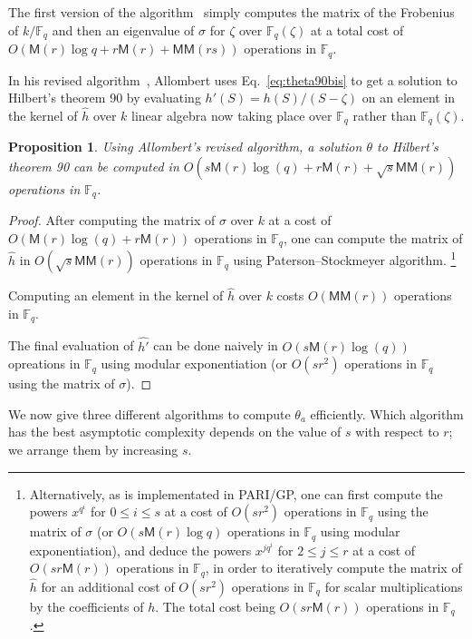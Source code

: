 \documentclass[12pt]{article}
\theoremstyle{plain}
\newtheorem{proposition}[theorem]{Proposition}
\theoremstyle{definition}
\def\F{\ensuremath{\mathbb{F}}}
\def\MM{\ensuremath{\mathsf{M}}}
\def\MMM{\ensuremath{\mathsf{MM}}}
\newcounter{algorithm}
\begin{document}
The first version of the algorithm~\cite{Allombert02}
simply computes the matrix of the Frobenius of $k/\F_q$
and then an eigenvalue of $\sigma$ for $\zeta$ over $\F_q(\zeta)$
at a total cost of $O(\MM(r) \log q + r \MM(r) + \MMM(rs))$
operations in $\F_q$.

In his revised algorithm~\cite{Allombert02-rev}, Allombert uses
Eq.~\eqref{eq:theta90bis} to get
a solution to Hilbert's theorem 90
by evaluating $h'(S)=h(S)/(S-\zeta)$
on an element in the kernel of $\hat{h}$ over $k$
linear algebra now taking place over $\F_q$ rather than $\F_q(\zeta)$.

\begin{proposition}
Using Allombert's revised algorithm,
a solution $\theta$ to Hilbert's theorem 90 can be computed in
$O(s \MM(r) \log(q) + r \MM(r) + \sqrt{s} \MMM(r))$ operations in $\F_q$.
\end{proposition}

\begin{proof}
After computing the matrix of $\sigma$ over $k$ at a cost of
$O(\MM(r) \log(q) + r \MM(r))$ operations in $\F_q$, one can compute
the matrix of $\hat{h}$ in $O(\sqrt{s} \MMM(r))$ operations in $\F_q$
using Paterson--Stockmeyer algorithm.%
\footnote{
Alternatively, as is implementated in PARI/GP,
one can first compute the powers $x^{q^i}$ for $0 \leq i \leq s$
at a cost of $O(s r^2)$ operations in $\F_q$ using the matrix of $\sigma$
(or $O(s \MM(r) \log q)$ operations in $\F_q$ using modular exponentiation),
and deduce the powers $x^{j q^i}$ for $2 \leq j \leq r$
at a cost of $O(s r \MM(r))$ operations in $\F_q$,
in order to iteratively compute the matrix of $\hat{h}$
for an additional cost of $O(s r^2)$ operations in $\F_q$ for scalar
multiplications by the coefficients of $h$.
The total cost being $O(s r \MM(r))$ operations in $\F_q$.
}

Computing an element in the kernel of $\hat{h}$
over $k$ costs $O(\MMM(r))$ operations in $\F_q$.

The final evaluation of $\hat{h'}$ can be done
naively in $O(s \MM(r) \log(q))$ opreations in $\F_q$
using modular exponentiation
(or $O(s r^2)$ operations in $\F_q$ using the matrix of $\sigma$).
\end{proof}

We now give three different algorithms to compute $\theta_a$ efficiently.
Which algorithm has the best asymptotic complexity depends on the
value of $s$ with respect to $r$; we arrange them by increasing $s$.
\end{document}
